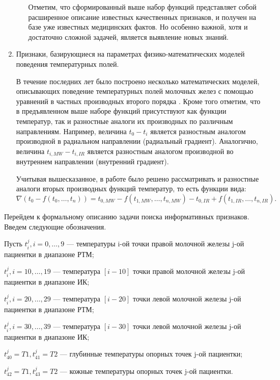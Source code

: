 \begin{enumerate}
\begin{enumerate}
        Отметим, что сформированный выше набор функций представляет собой расширенное описание известных качественных признаков, и получен на базе уже известных медицинских фактов. Но особенно важной, хотя и достаточно сложной задачей, является выявление новых знаний.
    \end{enumerate}
    \item Признаки, базирующиеся на параметрах физико-математических моделей поведения температурных полей.

    В течение последних лет было построено несколько математических моделей,
    описывающих поведение температурных полей молочных желез с помощью уравнений в
    частных производных второго порядка \cite{losevhoperskov, polhop1}.
    Кроме того отметим, что в предъявленном выше наборе функций присутствуют как функции
    температур, так и разностные аналоги их производных по различным направлениям.
    Например, величина \(t_{0} - t_{i}\) является разностным аналогом производной в
    радиальном направлении (радиальный градиент). Аналогично,
    величина \(t_{i, MW} - t_{i, IR}\) является разностным аналогом производной во внутреннем
    направлении (внутренний градиент).

    Учитывая вышесказанное, в работе было решено рассматривать и разностные аналоги вторых производных функций температур, то есть функции вида:
    \[\nabla(t_{0} - f(t_{0}, \dots, t_{n})) = t_{0, MW} - f(t_{1, MW}, \dots, t_{n, MW}) -
    t_{0, IR} + f(t_{1, IR}, \dots, t_{n, IR}). \]
\end{enumerate}

Перейдем к формальному описанию задачи поиска информативных
признаков. Введем следующие обозначения.

Пусть \(t_{i}^{j}, i = 0, \dots, 9\) --- температуры i-ой точки правой молочной железы j-ой пациентки в диапазоне РТМ;

\(t_{i}^{j}, i = 10, \dots, 19\) --- температура \([i - 10]\) точки правой молочной железы j-ой пациентки в диапазоне ИК;

\(t_{i}^{j}, i = 20, \dots, 29\) --- температура \([i - 20]\) точки левой молочной железы j-ой пациентки в диапазоне РТМ;

\(t_{i}^{j}, i = 30, \dots, 39\) --- температура \([i - 30]\) точки левой молочной железы j-ой пациентки в диапазоне ИК;

\(t_{40}^{j} = T1, t_{41}^{j} = T2\) --- глубинные температуры опорных точек j-ой пациентки;

\(t_{42}^{j} = T1, t_{43}^{j} = T2\) --- кожные температуры опорных точек j-ой пациентки.

